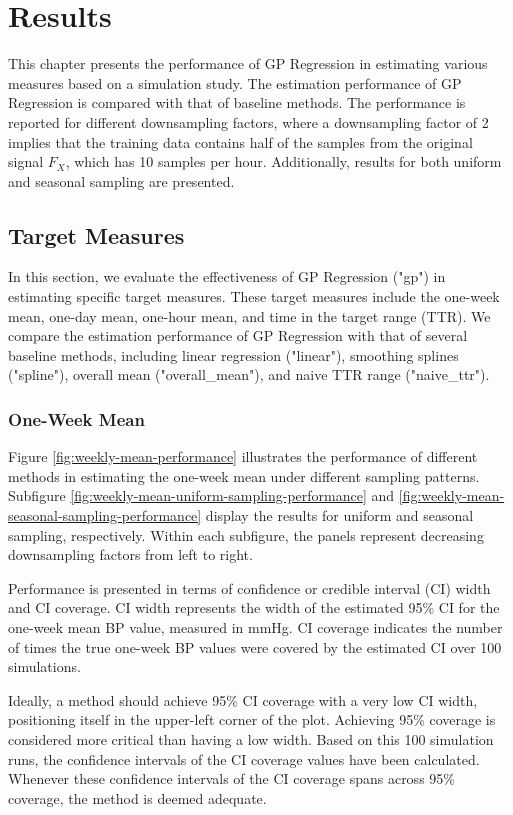 \chapter{Results}\label{ch:results}

This chapter presents the performance of GP Regression in estimating various
measures based on a simulation study.
The estimation performance of GP Regression is compared with that of baseline methods.
The performance is reported for different downsampling factors, where a downsampling
factor of 2 implies that the training data contains half of the samples from the
original signal $F_X$, which has 10 samples per hour.
Additionally, results for both uniform and seasonal sampling are presented.

\section{Target Measures}

In this section, we evaluate the effectiveness of GP Regression ("gp") in
estimating specific target measures. These target measures include the one-week mean,
one-day mean, one-hour mean, and time in the target range (TTR).
We compare the estimation performance of GP Regression with that of several baseline methods,
including linear regression ("linear"), smoothing splines ("spline"), overall mean
("overall\_mean"), and naive TTR range ("naive\_ttr").

\subsection{One-Week Mean}

Figure \ref{fig:weekly-mean-performance} illustrates the performance of different
methods in estimating the one-week mean under different sampling patterns.
Subfigure \ref{fig:weekly-mean-uniform-sampling-performance} and
\ref{fig:weekly-mean-seasonal-sampling-performance} display the results
for uniform and seasonal sampling, respectively. Within each subfigure, the panels
represent decreasing downsampling factors from left to right.

Performance is presented in terms of confidence or credible interval (CI) width and CI coverage.
CI width represents the width of the estimated 95\% CI for the one-week mean BP value,
measured in mmHg. CI coverage indicates the number of times the true one-week BP
values were covered by the estimated CI over 100 simulations.

Ideally, a method should achieve 95\% CI coverage with a very low CI width,
positioning itself in the upper-left corner of the plot. Achieving 95\% coverage
is considered more critical than having a low width.
Based on this 100 simulation runs, the confidence intervals
of the CI coverage values have been calculated.
Whenever these confidence intervals of the CI coverage
spans across 95\% coverage, the method is deemed adequate.

